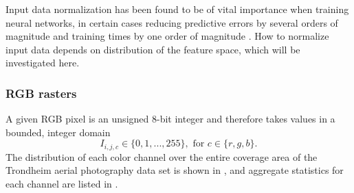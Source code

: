 Input data normalization has been found to be of vital importance when training neural networks, in certain cases reducing predictive errors by several orders of magnitude and training times by one order of magnitude \cite{input_normalization_1997}.
How to normalize input data depends on distribution of the feature space, which will be investigated here.


\subsubsection*{RGB rasters}

A given RGB pixel is an unsigned 8-bit integer and therefore takes values in a bounded, integer domain
%
\begin{equation*}
  I_{i,j,c} \in \{0, 1, ..., 255\}, \text{ for } c \in \{r, g, b\}.
\end{equation*}
%
The distribution of each color channel over the entire coverage area of the Trondheim aerial photography data set is shown in , and aggregate statistics for each channel are listed in .

\begin{figure}[htb]
  \begin{floatrow}
  \end{floatrow}
\end{figure}

